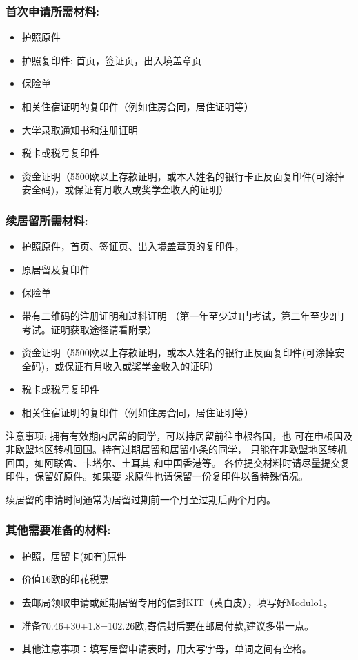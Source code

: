 \subsubsection{首次申请所需材料:}
\begin{itemize} 
\item 护照原件
\item 护照复印件: 首页，签证页，出入境盖章页
\item 保险单 
\item 相关住宿证明的复印件（例如住房合同，居住证明等）
\item 大学录取通知书和注册证明
\item 税卡或税号复印件
\item 资金证明（5500欧以上存款证明，或本人姓名的银行卡正反面复印件(可涂掉安全码)，或保证有月收入或奖学金收入的证明）
\end{itemize}

\subsubsection{续居留所需材料:}
\begin{itemize} 
\item 护照原件，首页、签证页、出入境盖章页的复印件，
\item 原居留及复印件
\item 保险单
\item 带有二维码的注册证明和过科证明  （第一年至少过1门考试，第二年至少2门考试。证明获取途径请看附录）
\item 资金证明（5500欧以上存款证明，或本人姓名的银行正反面复印件(可涂掉安全码)，或保证有月收入或奖学金收入的证明）
\item 税卡或税号复印件
\item 相关住宿证明的复印件（例如住房合同，居住证明等）
\end{itemize}
注意事项:
拥有有效期内居留的同学，可以持居留前往申根各国，也
可在申根国及非欧盟地区转机回国。持有过期居留和居留小条的同学，
只能在非欧盟地区转机回国，如阿联酋、卡塔尔、土耳其
和中国香港等。
各位提交材料时请尽量提交复印件，保留好原件。如果要
求原件也请保留一份复印件以备特殊情况。

续居留的申请时间通常为居留过期前一个月至过期后两个月内。 

\subsubsection{其他需要准备的材料:}
\begin{itemize} 
\item 护照，居留卡(如有)原件
\item 价值16欧的印花税票
\item 去邮局领取申请或延期居留专用的信封KIT（黄白皮），填写好Modulo1。
\item 准备70.46+30+1.8=102.26欧,寄信封后要在邮局付款,建议多带一点。
\item 其他注意事项：填写居留申请表时，用大写字母，单词之间有空格。
\end{itemize}


